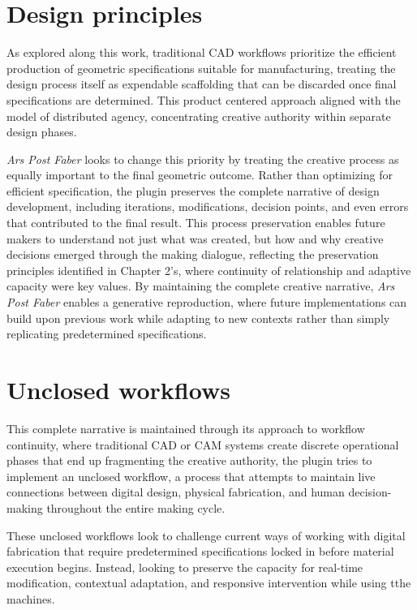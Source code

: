 \section{Design principles}

As explored along this work, traditional CAD workflows prioritize the efficient production of geometric specifications suitable for manufacturing, treating the design process itself as expendable scaffolding that can be discarded once final specifications are determined. This product centered approach aligned with the model of distributed agency, concentrating creative authority within separate design phases.

\vspace{0.5cm}

\textit{Ars Post Faber} looks to change this priority by treating the creative process as equally important to the final geometric outcome. Rather than optimizing for efficient specification, the plugin preserves the complete narrative of design development, including iterations, modifications, decision points, and even errors that contributed to the final result. This process preservation enables future makers to understand not just what was created, but how and why creative decisions emerged through the making dialogue, reflecting the preservation principles identified in Chapter 2's, where continuity of relationship and adaptive capacity were key values. By maintaining the complete creative narrative, \textit{Ars Post Faber} enables a generative reproduction, where future implementations can build upon previous work while adapting to new contexts rather than simply replicating predetermined specifications.

\section{Unclosed workflows}

This complete narrative is maintained through its approach to workflow continuity, where traditional CAD or CAM systems create discrete operational phases that end up fragmenting the creative authority, the plugin tries to implement an unclosed workflow, a process that attempts to maintain live connections between digital design, physical fabrication, and human decision-making throughout the entire making cycle.

\vspace{0.5cm}

These unclosed workflows look to challenge current ways of working with digital fabrication that require predetermined specifications locked in before material execution begins. Instead, looking to preserve the capacity for real-time modification, contextual adaptation, and responsive intervention while using tthe machines.

